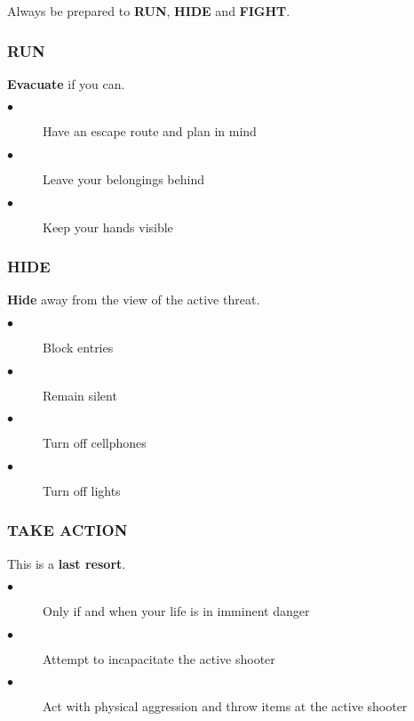 \documentclass{article}
\begin{document}
Always be prepared to \textbf{RUN}, \textbf{HIDE} and \textbf{FIGHT}.

\subsubsection{RUN}
\textbf{Evacuate} if you can.
\begin{description}
    \item[$\bullet$] Have an escape route and plan in mind
    \item[$\bullet$] Leave your belongings behind
    \item[$\bullet$] Keep your hands visible
\end{description}

\subsubsection{HIDE}
\textbf{Hide} away from the view of the active threat.
\begin{description}
    \item[$\bullet$] Block entries
    \item[$\bullet$] Remain silent
    \item[$\bullet$] Turn off cellphones
    \item[$\bullet$] Turn off lights
\end{description}

\subsubsection{TAKE ACTION}
This is a \textbf{last resort}.
\begin{description}
    \item[$\bullet$] Only if and when your life is in imminent danger
    \item[$\bullet$] Attempt to incapacitate the active shooter
    \item[$\bullet$] Act with physical aggression and throw items at the active shooter
\end{description}
\end{document}
